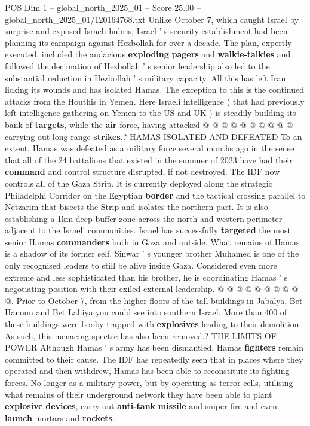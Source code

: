 \begin{textsample}{POS Dim 1 – global\_north\_2025\_01 – Score 25.00 – global\_north\_2025\_01/120164768.txt}
Unlike October 7, which caught Israel by surprise and exposed Israeli hubris, Israel ' s security establishment had been planning its campaign against Hezbollah for over a decade.
The plan, expertly executed, included the audacious \textbf{exploding} \textbf{pagers} and \textbf{walkie-talkies} and followed the decimation of Hezbollah ' s senior leadership also led to the substantial reduction in Hezbollah ' s military capacity.
All this has left Iran licking its wounds and has isolated Hamas.
The exception to this is the continued attacks from the Houthis in Yemen.
Here Israeli intelligence ( that had previously left intelligence gathering on Yemen to the US and UK ) is steadily building its bank of \textbf{targets}, while the \textbf{air} force, having attacked @ @ @ @ @ @ @ @ @ @ carrying out long-range \textbf{strikes}.?
HAMAS ISOLATED AND DEFEATED To an extent, Hamas was defeated as a military force several months ago in the sense that all of the 24 battalions that existed in the summer of 2023 have had their \textbf{command} and control structure disrupted, if not destroyed.
The IDF now controls all of the Gaza Strip.
It is currently deployed along the strategic Philadelphi Corridor on the Egyptian \textbf{border} and the tactical crossing parallel to Netzarim that bisects the Strip and isolates the northern part.
It is also establishing a 1km deep buffer zone across the north and western perimeter adjacent to the Israeli communities.
Israel has successfully \textbf{targeted} the most senior Hamas \textbf{commanders} both in Gaza and outside.
What remains of Hamas is a shadow of its former self.
Sinwar ' s younger brother Muhamed is one of the only recognised leaders to still be alive inside Gaza.
Considered even more extreme and less sophisticated than his brother, he is coordinating Hamas ' s negotiating position with their exiled external leadership. @ @ @ @ @ @ @ @ @ @.
Prior to October 7, from the higher floors of the tall buildings in Jabalya, Bet Hanoun and Bet Lahiya you could see into southern Israel.
More than 400 of these buildings were booby-trapped with \textbf{explosives} leading to their demolition.
As such, this menacing spectre has also been removed.?
THE LIMITS OF POWER Although Hamas ' s army has been dismantled, Hamas \textbf{fighters} remain committed to their cause.
The IDF has repeatedly seen that in places where they operated and then withdrew, Hamas has been able to reconstitute its fighting forces.
No longer as a military power, but by operating as terror cells, utilising what remains of their underground network they have been able to plant \textbf{explosive} \textbf{devices}, carry out \textbf{anti-tank} \textbf{missile} and sniper fire and even \textbf{launch} mortars and \textbf{rockets}.

\end{textsample}
